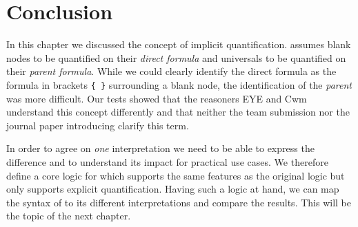 \section{Conclusion}
In this chapter we discussed the concept of implicit quantification. \nthree assumes blank nodes to be quantified on their \emph{direct formula} and universals to be 
quantified on their \emph{parent formula}. While we could clearly identify the direct formula as the formula in brackets \texttt{\{ \}} surrounding a blank node,
the identification of the \emph{parent} was more difficult. Our tests showed that the reasoners EYE and Cwm understand this concept differently and that neither
the \wwwc team submission nor the journal paper introducing \nthree clarify this term. 

In order to agree on \emph{one} interpretation we need to be able to express the difference and to understand its impact for practical use cases. We therefore 
define a core logic for \nthree which supports the same features as the original logic but only supports explicit quantification. Having such a logic at hand, we can map the syntax of 
\nthree to its different interpretations and compare the results. This will be the topic of the next chapter.
% 
% 
